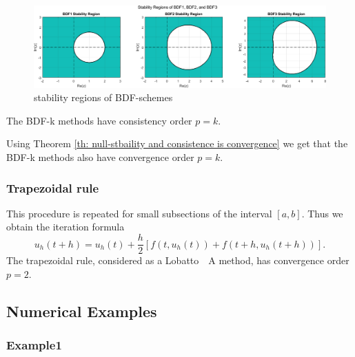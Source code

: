 	\begin{frame}
		\begin{figure}[H]
			\centering
			\includegraphics[width=0.8\linewidth]{../Tex/pictures/bdf_stability_regions.png}
			\caption{stability regions of BDF-schemes}
			\label{fig:screenshot020}
		\end{figure}
		\begin{theorem}%
			The BDF-k methods have consistency order $p=k$.
		\end{theorem}
		Using Theorem \ref{th: null-stbaility and consistence is convergence} we get that the BDF-k methods also have convergence order $p=k$.
	\end{frame}
	
	\subsubsection{Trapezoidal rule}
	
	\begin{frame}
		\vfill
		This procedure is repeated for small subsections of the interval $[a,b]$. Thus we obtain the iteration formula
		\begin{displaymath}
			u_h (t+h) = u_h(t) +\frac{h}{2}[f(t,u_h(t)) + f(t+h, u_h(t+h))].
		\end{displaymath}
		The trapezoidal rule, considered as a Lobatto~~A method, has convergence order $p=2$.
		\vfill
	\end{frame}
	
	
	
	\subsection*{Numerical Examples}
	
	\subsubsection{Example1}
	
